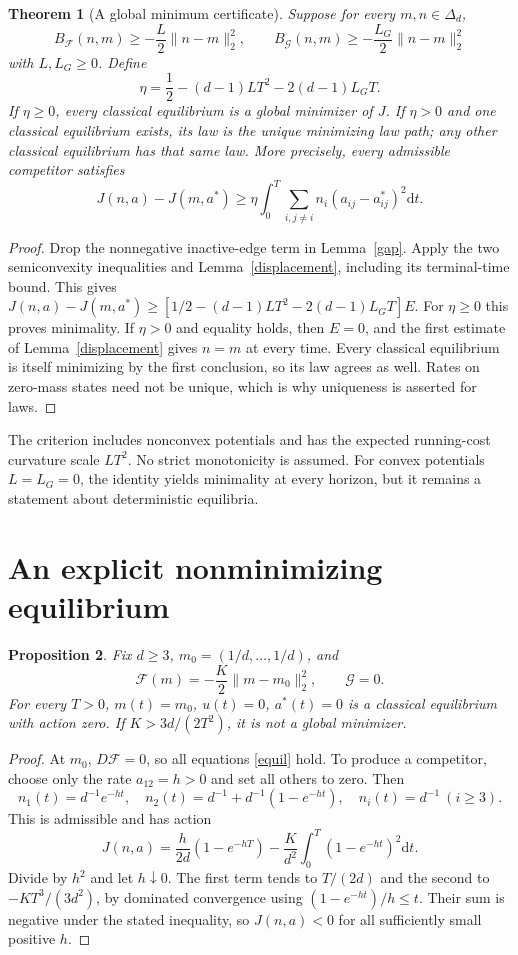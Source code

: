 \documentclass[11pt]{article}
\newtheorem{theorem}{Theorem}
\newtheorem{proposition}[theorem]{Proposition}
\newcommand{\dd}{\mathrm d}
\begin{document}
\begin{theorem}[A global minimum certificate]\label{small}
Suppose for every $m,n\in\Delta_d$,
\[
 B_{\mathcal F}(n,m)\ge-\frac L2\|n-m\|_2^2,\qquad
 B_{\mathcal G}(n,m)\ge-\frac {L_G}2\|n-m\|_2^2
\]
with $L,L_G\ge0$. Define
\[
 \eta=\frac12-(d-1)LT^2-2(d-1)L_GT.
\]
If $\eta\ge0$, every classical equilibrium is a global minimizer of $J$.
If $\eta>0$ and one classical equilibrium exists, its law is the unique minimizing law path; any other classical equilibrium has that same law. More precisely, every admissible competitor satisfies
\[
 J(n,a)-J(m,a^*)\ge\eta\int_0^T\sum_{i,j\ne i}n_i(a_{ij}-a^*_{ij})^2\dd t.
\]
\end{theorem}
\begin{proof}
Drop the nonnegative inactive-edge term in Lemma~\ref{gap}. Apply the two semiconvexity inequalities and Lemma~\ref{displacement}, including its terminal-time bound. This gives
$J(n,a)-J(m,a^*)\ge[1/2-(d-1)LT^2-2(d-1)L_GT]E$.
For $\eta\ge0$ this proves minimality. If $\eta>0$ and equality holds, then $E=0$, and the first estimate of Lemma~\ref{displacement} gives $n=m$ at every time. Every classical equilibrium is itself minimizing by the first conclusion, so its law agrees as well. Rates on zero-mass states need not be unique, which is why uniqueness is asserted for laws.
\end{proof}

The criterion includes nonconvex potentials and has the expected running-cost curvature scale $LT^2$. No strict monotonicity is assumed. For convex potentials $L=L_G=0$, the identity yields minimality at every horizon, but it remains a statement about deterministic equilibria.

\section{An explicit nonminimizing equilibrium}
\begin{proposition}\label{nonminimum}
Fix $d\ge3$, $m_0=(1/d,\ldots,1/d)$, and
\[
 \mathcal F(m)=-\frac K2\|m-m_0\|_2^2,\qquad\mathcal G=0.
\]
For every $T>0$, $m(t)=m_0$, $u(t)=0$, $a^*(t)=0$ is a classical equilibrium with action zero. If $K>3d/(2T^2)$, it is not a global minimizer.
\end{proposition}
\begin{proof}
At $m_0$, $D\mathcal F=0$, so all equations \eqref{equil} hold. To produce a competitor, choose only the rate $a_{12}=h>0$ and set all others to zero. Then
\[
 n_1(t)=d^{-1}e^{-ht},\quad n_2(t)=d^{-1}+d^{-1}(1-e^{-ht}),\quad n_i(t)=d^{-1}\ (i\ge3).
\]
This is admissible and has action
\[
 J(n,a)=\frac{h}{2d}(1-e^{-hT})-\frac K{d^2}\int_0^T(1-e^{-ht})^2\dd t.
\]
Divide by $h^2$ and let $h\downarrow0$. The first term tends to $T/(2d)$ and the second to $-KT^3/(3d^2)$, by dominated convergence using $(1-e^{-ht})/h\le t$. Their sum is negative under the stated inequality, so $J(n,a)<0$ for all sufficiently small positive $h$.
\end{proof}
\end{document}
